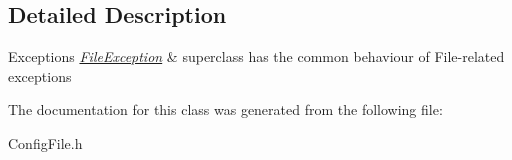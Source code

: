 \subsection{Detailed Description}

\begin{DoxyExceptions}{Exceptions}
{\em \hyperlink{class_config_file_1_1_file_exception}{File\+Exception}} & superclass has the common behaviour of File-\/related exceptions \\
\hline
\end{DoxyExceptions}


The documentation for this class was generated from the following file\+:\begin{DoxyCompactItemize}
\item 
Config\+File.\+h\end{DoxyCompactItemize}
